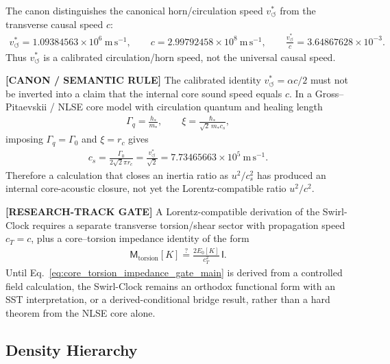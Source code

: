 \documentclass[11pt]{article}
\theoremstyle{definition}
\theoremstyle{plain}
\theoremstyle{remark}
\newcommand{\rc}{{r_c}}
\newcommand{\vchar}{v_{\!\boldsymbol{\circlearrowleft}}^{\ast}}
\begin{document}
        The canon distinguishes the canonical horn/circulation speed \(\vchar\) from the transverse causal speed \(c\):
        \begin{align}
            \vchar = 1.09384563\times 10^{6}\ \mathrm{m\,s^{-1}},
            \qquad
            c = 2.99792458\times 10^{8}\ \mathrm{m\,s^{-1}},
            \qquad
            \frac{\vchar}{c}=3.64867628\times10^{-3}.
        \end{align}
        Thus \(\vchar\) is a calibrated circulation/horn speed, not the universal causal speed.

        \textbf{[CANON / SEMANTIC RULE]} The calibrated identity \(\vchar=\alpha c/2\) must not be inverted into a claim that the internal core sound speed equals \(c\).  In a Gross--Pitaevskii / NLSE core model with circulation quantum and healing length
        \begin{align}
            \Gamma_q = \frac{h_*}{m_*},
            \qquad
            \xi = \frac{\hbar_*}{\sqrt{2}\,m_* c_s},
        \end{align}
        imposing \(\Gamma_q=\Gamma_0\) and \(\xi=\rc\) gives
        \begin{align}
            c_s
            =
            \frac{\Gamma_0}{2\sqrt{2}\pi\rc}
            =
            \frac{\vchar}{\sqrt{2}}
            =
            7.73465663\times10^{5}\ \mathrm{m\,s^{-1}}.
            \label{eq:core_sound_speed_vchar_over_sqrt2}
        \end{align}
        Therefore a calculation that closes an inertia ratio as \(u^2/c_s^2\) has produced an internal core-acoustic closure, not yet the Lorentz-compatible ratio \(u^2/c^2\).

        \textbf{[RESEARCH-TRACK GATE]} A Lorentz-compatible derivation of the Swirl-Clock requires a separate transverse torsion/shear sector with propagation speed \(c_T=c\), plus a core--torsion impedance identity of the form
        \begin{align}
            \mathsf M_{\mathrm{torsion}}[K]
            \stackrel{?}{=}
            \frac{2E_0[K]}{c_T^2}\,\mathsf I .
            \label{eq:core_torsion_impedance_gate_main}
        \end{align}
        Until Eq.~\eqref{eq:core_torsion_impedance_gate_main} is derived from a controlled field calculation, the Swirl-Clock remains an orthodox functional form with an SST interpretation, or a derived-conditional bridge result, rather than a hard theorem from the NLSE core alone.

    \subsection{Density Hierarchy}
        
\end{document}
